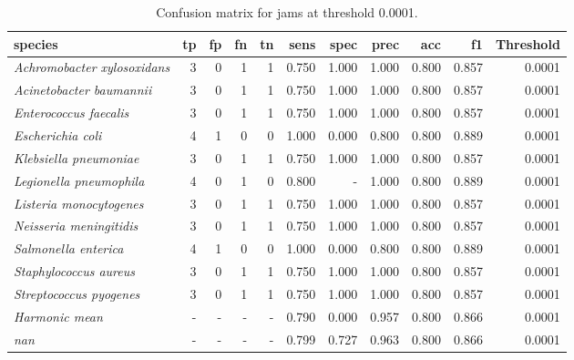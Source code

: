 \begin{table}[H]
\centering
\begin{tabular}{lrrrrrrrrrr}
\hline
\textbf{species} & \textbf{tp} & \textbf{fp} & \textbf{fn} & \textbf{tn} & \textbf{sens} & \textbf{spec} & \textbf{prec} & \textbf{acc} & \textbf{f1} & \textbf{Threshold} \\
\hline
\itshape Achromobacter xylosoxidans & 3 & 0 & 1 & 1 & 0.750 & 1.000 & 1.000 & 0.800 & 0.857 & 0.0001 \\
\itshape Acinetobacter baumannii & 3 & 0 & 1 & 1 & 0.750 & 1.000 & 1.000 & 0.800 & 0.857 & 0.0001 \\
\itshape Enterococcus faecalis & 3 & 0 & 1 & 1 & 0.750 & 1.000 & 1.000 & 0.800 & 0.857 & 0.0001 \\
\itshape Escherichia coli & 4 & 1 & 0 & 0 & 1.000 & 0.000 & 0.800 & 0.800 & 0.889 & 0.0001 \\
\itshape Klebsiella pneumoniae & 3 & 0 & 1 & 1 & 0.750 & 1.000 & 1.000 & 0.800 & 0.857 & 0.0001 \\
\itshape Legionella pneumophila & 4 & 0 & 1 & 0 & 0.800 & - & 1.000 & 0.800 & 0.889 & 0.0001 \\
\itshape Listeria monocytogenes & 3 & 0 & 1 & 1 & 0.750 & 1.000 & 1.000 & 0.800 & 0.857 & 0.0001 \\
\itshape Neisseria meningitidis & 3 & 0 & 1 & 1 & 0.750 & 1.000 & 1.000 & 0.800 & 0.857 & 0.0001 \\
\itshape Salmonella enterica & 4 & 1 & 0 & 0 & 1.000 & 0.000 & 0.800 & 0.800 & 0.889 & 0.0001 \\
\itshape Staphylococcus aureus & 3 & 0 & 1 & 1 & 0.750 & 1.000 & 1.000 & 0.800 & 0.857 & 0.0001 \\
\itshape Streptococcus pyogenes & 3 & 0 & 1 & 1 & 0.750 & 1.000 & 1.000 & 0.800 & 0.857 & 0.0001 \\
\itshape Harmonic mean & - & - & - & - & 0.790 & 0.000 & 0.957 & 0.800 & 0.866 & 0.0001 \\
\itshape nan & - & - & - & - & 0.799 & 0.727 & 0.963 & 0.800 & 0.866 & 0.0001 \\
\end{tabular}
\caption{Confusion matrix for jams at threshold 0.0001.}
\label{tab:conf_jams_0.0001}
\end{table}
